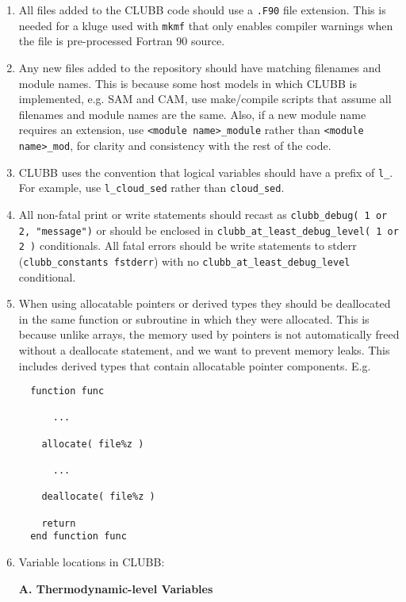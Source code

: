 \documentclass[letterpaper,12pt]{article}
\begin{document}
\begin{enumerate}
\item All files added to the CLUBB code should use a \texttt{.F90} file 
extension.  This is needed for a kluge used with \texttt{mkmf} that only enables
compiler warnings when the file is pre-processed Fortran 90 source. 

\item Any new files added to the repository should have matching filenames and module names. 
This is because some host models in which CLUBB is implemented, e.g. SAM and CAM, use 
make/compile scripts that assume all filenames and module names are the same.
Also, if a new module name requires an extension, use \verb|<module name>_module|
rather than \verb|<module name>_mod|, for clarity and consistency with the rest of the code. 

\item CLUBB uses the convention that logical variables should have a prefix of \verb|l_|.  For example,
use \verb|l_cloud_sed| rather than \verb|cloud_sed|.

\item All non-fatal print or write statements should recast as \verb|clubb_debug( 1 or 2, "message")| or
should be enclosed in \verb|clubb_at_least_debug_level( 1 or 2 )| conditionals. All fatal errors should
be write statements to stderr (\verb|clubb_constants fstderr|) with no \verb|clubb_at_least_debug_level| conditional.

\item When using allocatable pointers or derived types they should be deallocated in the same function or subroutine 
in which they were allocated.  This is because unlike arrays, the memory used by pointers is not 
automatically freed without a deallocate statement, and we want to prevent memory leaks. This includes 
derived types that contain allocatable pointer components. E.g. \\
\begin{verbatim}
  function func

      ...

    allocate( file%z )

      ...

    deallocate( file%z )

    return
  end function func
\end{verbatim}

\item Variable locations in CLUBB:

  {\bf A. Thermodynamic-level Variables}


\end{enumerate}
\end{document}
